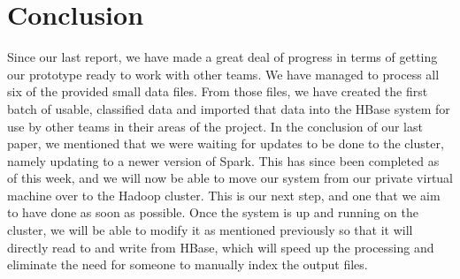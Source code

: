 \chapter{Conclusion}\label{ch:conclusion}


Since our last report, we have made a great deal of progress in terms of getting our prototype ready to work with other teams. We have managed to process all six of the provided small data files. From those files, we have created the first batch of usable, classified data and imported that data into the HBase system for use by other teams in their areas of the project. In the conclusion of our last paper, we mentioned that we were waiting for updates to be done to the cluster, namely updating to a newer version of Spark. This has since been completed as of this week, and we will now be able to move our system from our private virtual machine over to the Hadoop cluster. This is our next step, and one that we aim to have done as soon as possible. Once the system is up and running on the cluster, we will be able to modify it as mentioned previously so that it will directly read to and write from HBase, which will speed up the processing and eliminate the need for someone to manually index the output files.








